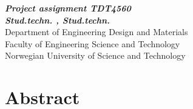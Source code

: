 \begin{center}
{\Large\bfseries \mytitle}
\end{center}

\begin{center}
{\bfseries\slshape Project assignment TDT4560}
\\[1.0cm]
{\bfseries\slshape
Stud.techn. \myauthorA, Stud.techn. \myauthorB \\}
Department of Engineering Design and Materials \\
Faculty of Engineering Science and Technology\\
Norwegian University of Science and Technology
\end{center}
\section*{Abstract}




